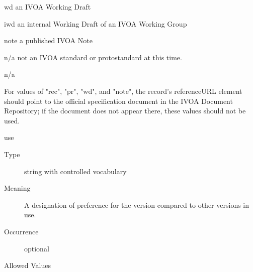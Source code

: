 \documentclass[11pt,a4paper]{ivoa}
\begin{document}
\begin{generated}
\begin{bigdescription}
\begin{description}
\begin{longtermsdescription}
\item[wd]
                            an IVOA Working Draft
                         
\item[iwd]
                            an internal Working Draft of an IVOA Working Group
                         
\item[note]
                            a published IVOA Note
                         
\item[n/a]
                            not an IVOA standard or protostandard at
                            this time. 
                         
\end{longtermsdescription}
\item[Default] n/a
\item[Comment] 
                 For values of {"}rec{"}, {"}pr{"}, {"}wd{"}, and {"}note{"}, the
                 record's referenceURL element should point to the
                 official specification document in the IVOA Document
                 Repository; if the document does not appear there,
                 these values should not be used. 
               
\end{description}
\item[use]
\begin{description}
\item[Type] string with controlled vocabulary
\item[Meaning] 
                 A designation of preference for the version compared
                 to other versions in use.
               
\item[Occurrence] optional

\item[Allowed Values]\hfil
{}
\end{description}


\end{bigdescription}\endgroup

\endgroup
\end{generated}
\end{document}
